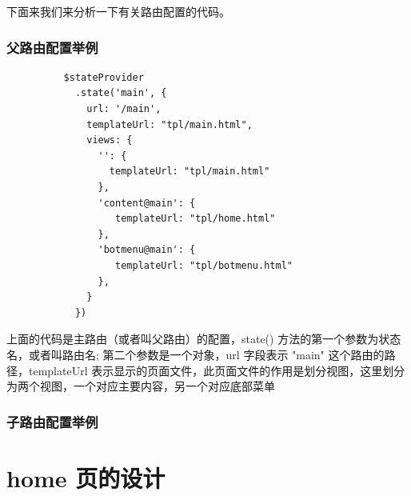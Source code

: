 \documentclass[UTF8]{ctexbook}
\begin{document}
    下面来我们来分析一下有关路由配置的代码。
      \subsubsection{父路由配置举例}
        \label{subsubsec:父路由配置举例}

        \begin{lstlisting}
          $stateProvider
            .state('main', {
              url: '/main',
              templateUrl: "tpl/main.html",
              views: {
                '': {
                  templateUrl: "tpl/main.html"
                },
                'content@main': {
                   templateUrl: "tpl/home.html"
                },
                'botmenu@main': {
                   templateUrl: "tpl/botmenu.html"
                },
              }
            })
        \end{lstlisting}
        上面的代码是主路由（或者叫父路由）的配置，state() 方法的第一个参数为状态名，或者叫路由名; 第二个参数是一个对象，url 字段表示 "main" 这个路由的路径，templateUrl 表示显示的页面文件，此页面文件的作用是划分视图，这里划分为两个视图，一个对应主要内容，另一个对应底部菜单

      \subsubsection{子路由配置举例}
        \label{subsubsec:子路由配置举例}

  \section{home 页的设计}
    \label{sec:home_页的设计}
\end{document}
